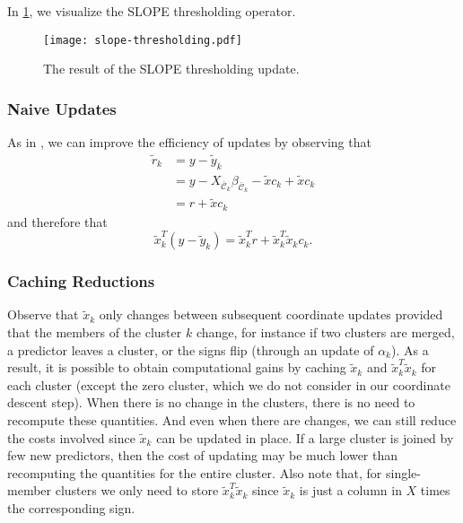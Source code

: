 In \cref{fig:slope-thresholding}, we visualize the SLOPE thresholding operator.

\begin{figure}[htbp]
  \centering
  \texttt{[image: slope-thresholding.pdf]}
  \caption{The result of the SLOPE thresholding update.}
  \label{fig:slope-thresholding}
\end{figure}

\subsubsection{Naive Updates}

As in \textcite{friedman2010}, we can improve the efficiency of updates by observing that
\begin{equation*}
  \begin{aligned}
    \tilde r_k & = y - \tilde y_k                                                                       \\
               & = y - X_{\bar{\mathcal{C}}_k}\beta_{\bar{\mathcal{C}}_k} - \tilde x c_k + \tilde x c_k \\
               & = r + \tilde x c_k
  \end{aligned}
\end{equation*}
and therefore that
\begin{equation}
  \label{eq:naive-update}
  \tilde x_k^T (y - \tilde y_k) = \tilde x_k^T r + \tilde x_k^T \tilde x_k c_k.
\end{equation}

\subsubsection{Caching Reductions}

Observe that \(\tilde x_k\) only changes between subsequent coordinate updates provided that the members of the cluster \(k\) change, for instance if two clusters are merged, a predictor leaves a cluster, or the signs flip (through an update of \(\alpha_k\)).
As a result, it is possible to obtain computational gains by caching \(\tilde x_k\) and \(\tilde x_k^T \tilde x_k\) for each cluster (except the zero cluster, which we do not consider in our coordinate descent step).
When there is no change in the clusters, there is no need to recompute these quantities.
And even when there are changes, we can still reduce the costs involved since \(\tilde x_k\) can be updated in place.
If a large cluster is joined by few new predictors, then the cost of updating may be much lower than recomputing the quantities for the entire cluster.
Also note that, for single-member clusters we only need to store \(\tilde x_k^T \tilde x_k\) since \(\tilde x_k\) is just a column in \(X\) times the corresponding sign.

